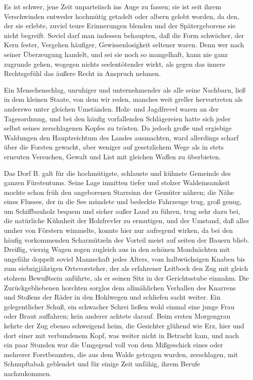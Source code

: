 Es ist schwer, jene Zeit unparteiisch ins Auge zu fassen; sie ist seit ihrem Verschwinden entweder hochmütig getadelt oder albern gelobt worden, da den, der sie erlebte, zuviel teure Erinnerungen blenden und der Spätergeborene sie nicht begreift. Soviel darf man indessen behaupten, daß die Form schwächer, der Kern fester, Vergehen häufiger, Gewissenlosigkeit seltener waren. Denn wer nach seiner Überzeugung handelt, und sei sie noch so mangelhaft, kann nie ganz zugrunde gehen, wogegen nichts seelentötender wirkt, als gegen das innere Rechtsgefühl das äußere Recht in Anspruch nehmen.

Ein Menschenschlag, unruhiger und unternehmender als alle seine Nachbarn, ließ in dem kleinen Staate, von dem wir reden, manches weit greller hervortreten als anderswo unter gleichen Umständen. Holz- und Jagdfrevel waren an der Tagesordnung, und bei den häufig vorfallenden Schlägereien hatte sich jeder selbst seines zerschlagenen Kopfes zu trösten. Da jedoch große und ergiebige Waldungen den Hauptreichtum des Landes ausmachten, ward allerdings scharf über die Forsten gewacht, aber weniger auf gesetzlichem Wege als in stets erneuten Versuchen, Gewalt und List mit gleichen Waffen zu überbieten.

Das Dorf B. galt für die hochmütigste, schlauste und kühnste Gemeinde des ganzen Fürstentums. Seine Lage inmitten tiefer und stolzer Waldeinsamkeit mochte schon früh den angeborenen Starrsinn der Gemüter nähren; die Nähe eines Flusses, der in die See mündete und bedeckte Fahrzeuge trug, groß genug, um Schiffbauholz bequem und sicher außer Land zu führen, trug sehr dazu bei, die natürliche Kühnheit der Holzfrevler zu ermutigen, und der Umstand, daß alles umher von Förstern wimmelte, konnte hier nur aufregend wirken, da bei den häufig vorkommenden Scharmützeln der Vorteil meist auf seiten der Bauern blieb. Dreißig, vierzig Wagen zogen zugleich aus in den schönen Mondnächten mit ungefähr doppelt soviel Mannschaft jedes Alters, vom halbwüchsigen Knaben bis zum siebzigjährigen Ortsvorsteher, der als erfahrener Leitbock den Zug mit gleich stolzem Bewußtsein anführte, als er seinen Sitz in der Gerichtsstube einnahm. Die Zurückgebliebenen horchten sorglos dem allmählichen Verhallen des Knarrens und Stoßens der Räder in den Hohlwegen und schliefen sacht weiter. Ein gelegentlicher Schuß, ein schwacher Schrei ließen wohl einmal eine junge Frau oder Braut auffahren; kein anderer achtete darauf. Beim ersten Morgengrau kehrte der Zug ebenso schweigend heim, die Gesichter glühend wie Erz, hier und dort einer mit verbundenem Kopf, was weiter nicht in Betracht kam, und nach ein paar Stunden war die Umgegend voll von dem Mißgeschick eines oder mehrerer Forstbeamten, die aus dem Walde getragen wurden, zerschlagen, mit Schnupftabak geblendet und für einige Zeit unfähig, ihrem Berufe nachzukommen.

